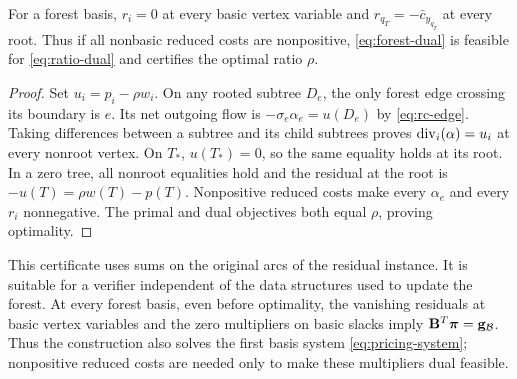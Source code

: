 \begin{proposition}\label{prop:certificate}
For a forest basis, $r_i=0$ at every basic vertex variable and
$r_{q_T}=-\bar c_{y_{q_T}}$ at every root. Thus if all nonbasic reduced
costs are nonpositive, \eqref{eq:forest-dual} is feasible for
\eqref{eq:ratio-dual} and certifies the optimal ratio $\rho$.
\end{proposition}
\begin{proof}
Set $u_i=p_i-\rho w_i$. On any rooted subtree $D_e$, the only forest edge
crossing its boundary is $e$. Its net outgoing flow is
$-\sigma_e\alpha_e=u(D_e)$ by \eqref{eq:rc-edge}. Taking differences between
a subtree and its child subtrees proves $\operatorname{div}_i(\alpha)=u_i$ at every
nonroot vertex. On $T_*$, $u(T_*)=0$, so the same equality holds at its root.
In a zero tree, all nonroot equalities hold and the residual at the root
is $-u(T)=\rho w(T)-p(T)$. Nonpositive reduced costs make every $\alpha_e$
and every $r_i$ nonnegative. The primal and dual objectives both equal
$\rho$, proving optimality.
\end{proof}
This certificate uses sums on the original arcs of the residual instance.
It is suitable for a verifier independent of the data structures used to
update the forest.
At every forest basis, even before optimality, the vanishing residuals at
basic vertex variables and the zero multipliers on basic slacks imply
$\mathbf{B}^T\boldsymbol{\pi}=\mathbf{g}_{\mathcal B}$. Thus the construction also solves the first basis system
\eqref{eq:pricing-system}; nonpositive reduced costs are needed only to make
these multipliers dual feasible.
